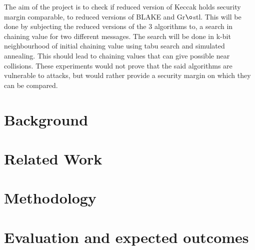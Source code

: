 \documentclass[12pt]{artikel3}                  %
\begin{document}
The aim of the project is to check if reduced version of Keccak holds security margin comparable, to reduced
versions of BLAKE and Gr$\o$stl. This will be done by subjecting the reduced versions of the 3 algorithms
to, a search in chaining value for two different messages. The search will be done in k-bit neighbourhood of
initial chaining value using tabu search and simulated annealing. This should lead to chaining values that can
give possible near collisions. These experiments would not prove that the said algorithms are vulnerable to 
attacks, but would rather provide a security margin on which they can be compared.
 
\section{Background}

\section{Related Work}

\section{Methodology}

\section{Evaluation and expected outcomes}



\end{document}
